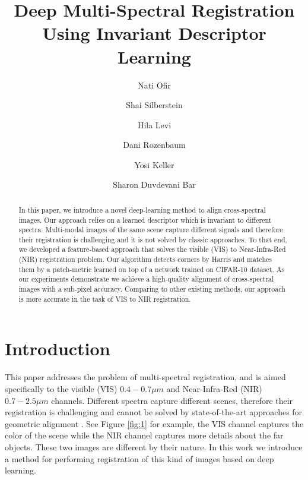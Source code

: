 \documentclass[10pt,twocolumn,letterpaper]{article}
\begin{document}
\title{Deep Multi-Spectral Registration Using Invariant Descriptor Learning}

\author{Nati Ofir\\
\and
Shai Silberstein\\
\and
Hila Levi\\
\and
Dani Rozenbaum \and
Yosi Keller \and
Sharon Duvdevani Bar
}

\maketitle

\begin{abstract}
	In this paper, we introduce a novel deep-learning method to align cross-spectral images. Our approach relies on a learned descriptor which is invariant to different spectra. Multi-modal images of the same scene capture different signals and therefore their registration is challenging and it is not solved by classic approaches. To that end, we developed a feature-based approach that solves the visible (VIS) to Near-Infra-Red (NIR) registration problem. Our algorithm detects corners by Harris \cite{harris} and matches them by a patch-metric learned on top of a network trained on CIFAR-10 \cite{krizhevsky2009learning} dataset. As our experiments demonstrate we achieve a high-quality alignment of cross-spectral images with a sub-pixel accuracy. Comparing to other existing methods, our approach is more accurate in the task of VIS to NIR registration.
\end{abstract}

\section{Introduction}

This paper addresses the problem of multi-spectral registration, and is aimed specifically to the visible (VIS) $0.4-0.7 \mu m$ and Near-Infra-Red (NIR) $0.7-2.5\mu m$ channels. Different spectra capture different scenes, therefore their registration is challenging and cannot be solved by state-of-the-art approaches for geometric alignment \cite{zitovaSurvey}. See Figure \ref{fig:1} for example, the VIS channel captures the color of the scene while the NIR channel captures more details about the far objects. These two images are different by their nature. In this work we introduce a method for performing registration of this kind of images based on deep learning.
\end{document}
